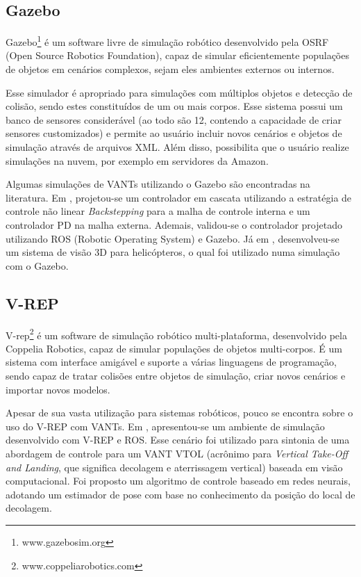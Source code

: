 \subsection{Gazebo}

Gazebo\footnote{www.gazebosim.org} \'e um software livre de simula\c c\~ao rob\'otico desenvolvido pela OSRF (Open Source Robotics Foundation), capaz de simular eficientemente popula\c c\~oes de objetos em cen\'arios complexos, sejam eles ambientes externos ou internos.

Esse simulador é apropriado para simulações com múltiplos objetos e detecção de colisão, sendo estes constituídos de um ou mais corpos. Esse sistema possui um banco de sensores considerável (ao todo são 12, contendo a capacidade de criar sensores customizados) e permite ao usuário incluir novos cenários e objetos de simulação através de arquivos XML. Além disso, possibilita que o usuário realize simulações na nuvem, por exemplo em servidores da Amazon. 

Algumas simulações de VANTs utilizando o Gazebo são encontradas na literatura. Em \cite{Nagaty2013}, projetou-se um controlador em cascata utilizando a estratégia de controle não linear  \textit{Backstepping} para a malha de controle interna e um controlador PD na malha externa. Ademais, validou-se o controlador projetado utilizando ROS (Robotic Operating System) e Gazebo. Já em \cite{Martinez2013}, desenvolveu-se um sistema de visão 3D para helicópteros, o qual foi utilizado numa simulação com o Gazebo.

\subsection{V-REP}

V-rep\footnote{www.coppeliarobotics.com} \'e um software de simula\c c\~ao rob\'otico multi-plataforma, desenvolvido pela Coppelia Robotics, capaz de simular popula\c c\~oes de objetos multi-corpos. É um sistema com interface amigável e suporte a várias linguagens de programação, sendo capaz de tratar colisões entre objetos de simulação, criar novos cenários e importar novos modelos. 

Apesar de sua vasta utilização para sistemas robóticos, pouco se encontra sobre o uso do V-REP com VANTs. Em \cite{7158723}, apresentou-se um ambiente de simulação desenvolvido com V-REP e ROS. Esse cenário foi utilizado para sintonia de uma abordagem de controle para um VANT VTOL (acrônimo para  \textit{Vertical Take-Off and Landing}, que significa decolagem e aterrissagem vertical) baseada em visão computacional. Foi proposto um algoritmo de controle baseado em redes neurais, adotando um estimador de pose com base no conhecimento da posição do local de decolagem. 


